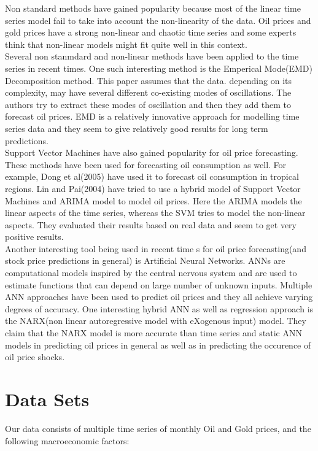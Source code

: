 \documentclass[runningheads]{llncs}
\begin{document}
\noindent Non standard methods have gained popularity because most of the linear time series model fail to take into account the non-linearity of the data. Oil prices and gold prices have a strong non-linear and chaotic time series and some experts think that non-linear models might fit quite well in this context.\\
\noindent Several non stanmdard and non-linear methods have been applied to the time series in recent times. One such interesting method is the Emperical Mode(EMD) Decomposition method\cite{oil-zhang}. This paper assumes that the data. depending on its complexity, may have several different co-existing modes of oscillations. The authors try to extract these modes of oscillation and then they add them to forecast oil prices. EMD is a relatively innovative approach for modelling time series data and they seem to give relatively good results for long term predictions.\\
\noindent Support Vector Machines have also gained popularity for oil price forecasting. These methods have been used for forecasting oil consumption as well. For example, Dong et al(2005)\cite{dongbing} have used it to forecast oil consumption in tropical regions. Lin and Pai(2004) have tried to use a hybrid model of Support Vector Machines and ARIMA model to model oil prices. Here the ARIMA models the linear aspects of the time series, whereas the SVM tries to model the non-linear aspects. They evaluated their results based on real data and seem to get very positive results.\\
\noindent Another interesting tool being used in recent time s for oil price forecasting(and stock price predictions in general) is Artificial Neural Networks. ANNs are computational models inspired by the central nervous system and are used to estimate functions that can depend on large number of unknown inputs. Multiple ANN approaches have been used to predict oil prices and they all achieve varying degrees of accuracy. One interesting hybrid ANN as well as regression approach is the NARX(non linear autoregressive model with eXogenous input) model. They claim that the NARX model is more accurate than time series and static ANN models in predicting oil prices in general as well as in predicting the occurence of oil price shocks.\\
   
\section{Data Sets}
Our data consists of multiple time series of monthly Oil and Gold prices\cite{quandal}, and the following macroeconomic factors:
\end{document}
